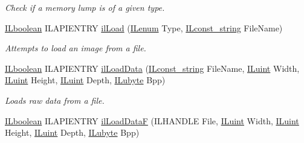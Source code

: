 \begin{DoxyCompactItemize}
\begin{DoxyCompactList}\small\item\em Check if a memory lump is of a given type. \end{DoxyCompactList}\item 
\hyperlink{group__il__types_gaa6aa7c95cfdc06b4d8601ef832b7bb0a}{I\+Lboolean} I\+L\+A\+P\+I\+E\+N\+T\+R\+Y \hyperlink{group__file_ga9972544062275b0cf8f41acef375d88f}{il\+Load} (\hyperlink{group__il__types_ga62ca73445716183ef42b1f3906a45ed0}{I\+Lenum} Type, \hyperlink{group__il__types_ga1aa1edc3eb344e14acacb02bade24a5a}{I\+Lconst\+\_\+string} File\+Name)
\begin{DoxyCompactList}\small\item\em Attempts to load an image from a file. \end{DoxyCompactList}\item 
\hypertarget{group__file_gaf39ed11daf8c151dff75be87afacdfca}{\hyperlink{group__il__types_gaa6aa7c95cfdc06b4d8601ef832b7bb0a}{I\+Lboolean} I\+L\+A\+P\+I\+E\+N\+T\+R\+Y \hyperlink{group__file_gaf39ed11daf8c151dff75be87afacdfca}{il\+Load\+Data} (\hyperlink{group__il__types_ga1aa1edc3eb344e14acacb02bade24a5a}{I\+Lconst\+\_\+string} File\+Name, \hyperlink{group__il__types_gaff8e86a1072c8d7cfe387fb87c6ed8e1}{I\+Luint} Width, \hyperlink{group__il__types_gaff8e86a1072c8d7cfe387fb87c6ed8e1}{I\+Luint} Height, \hyperlink{group__il__types_gaff8e86a1072c8d7cfe387fb87c6ed8e1}{I\+Luint} Depth, \hyperlink{group__il__types_ga057357939bc5a12e8061715453568519}{I\+Lubyte} Bpp)}\label{group__file_gaf39ed11daf8c151dff75be87afacdfca}

\begin{DoxyCompactList}\small\item\em Loads raw data from a file. \end{DoxyCompactList}\item 
\hypertarget{group__file_ga50049c04c459b921cafcdd7b837ac8ee}{\hyperlink{group__il__types_gaa6aa7c95cfdc06b4d8601ef832b7bb0a}{I\+Lboolean} I\+L\+A\+P\+I\+E\+N\+T\+R\+Y \hyperlink{group__file_ga50049c04c459b921cafcdd7b837ac8ee}{il\+Load\+Data\+F} (I\+L\+H\+A\+N\+D\+L\+E File, \hyperlink{group__il__types_gaff8e86a1072c8d7cfe387fb87c6ed8e1}{I\+Luint} Width, \hyperlink{group__il__types_gaff8e86a1072c8d7cfe387fb87c6ed8e1}{I\+Luint} Height, \hyperlink{group__il__types_gaff8e86a1072c8d7cfe387fb87c6ed8e1}{I\+Luint} Depth, \hyperlink{group__il__types_ga057357939bc5a12e8061715453568519}{I\+Lubyte} Bpp)}\label{group__file_ga50049c04c459b921cafcdd7b837ac8ee}


\end{DoxyCompactItemize}
